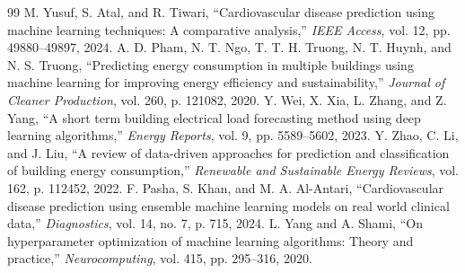 \documentclass[conference]{IEEEtran}
\begin{document}
\begin{thebibliography}{99}
 M. Yusuf, S. Atal, and R. Tiwari, ``Cardiovascular disease prediction using machine learning techniques: A comparative analysis,'' \emph{IEEE Access}, vol. 12, pp. 49880--49897, 2024.
 A. D. Pham, N. T. Ngo, T. T. H. Truong, N. T. Huynh, and N. S. Truong, ``Predicting energy consumption in multiple buildings using machine learning for improving energy efficiency and sustainability,'' \emph{Journal of Cleaner Production}, vol. 260, p. 121082, 2020.
 Y. Wei, X. Xia, L. Zhang, and Z. Yang, ``A short term building electrical load forecasting method using deep learning algorithms,'' \emph{Energy Reports}, vol. 9, pp. 5589--5602, 2023.
 Y. Zhao, C. Li, and J. Liu, ``A review of data-driven approaches for prediction and classification of building energy consumption,'' \emph{Renewable and Sustainable Energy Reviews}, vol. 162, p. 112452, 2022.
 F. Pasha, S. Khan, and M. A. Al-Antari, ``Cardiovascular disease prediction using ensemble machine learning models on real world clinical data,'' \emph{Diagnostics}, vol. 14, no. 7, p. 715, 2024.
 L. Yang and A. Shami, ``On hyperparameter optimization of machine learning algorithms: Theory and practice,'' \emph{Neurocomputing}, vol. 415, pp. 295--316, 2020.
\end{thebibliography}
\end{document}
